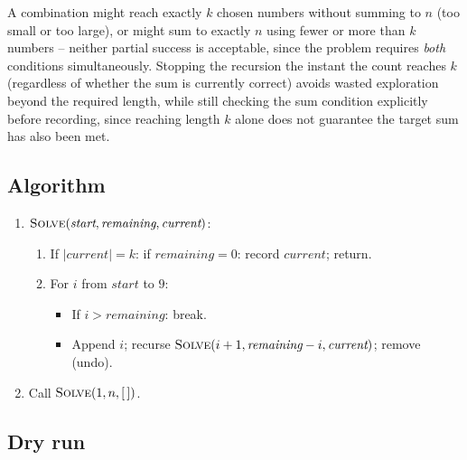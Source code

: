 A combination might reach exactly $k$ chosen numbers without summing to
$n$ (too small or too large), or might sum to exactly $n$ using fewer or
more than $k$ numbers -- neither partial success is acceptable, since the
problem requires \emph{both} conditions simultaneously. Stopping the
recursion the instant the count reaches $k$ (regardless of whether the
sum is currently correct) avoids wasted exploration beyond the required
length, while still checking the sum condition explicitly before
recording, since reaching length $k$ alone does not guarantee the target
sum has also been met.

\subsection*{Algorithm}

\begin{enumerate}
  \item $\textsc{Solve}(\textit{start}, \textit{remaining}, \textit{current})$:
  \begin{enumerate}
    \item If $|\textit{current}|=k$: if $\textit{remaining}=0$: record
          $\textit{current}$; return.
    \item For $i$ from $\textit{start}$ to $9$:
    \begin{itemize}
      \item If $i > \textit{remaining}$: break.
      \item Append $i$; recurse $\textsc{Solve}(i+1, \textit{remaining}-i,
            \textit{current})$; remove (undo).
    \end{itemize}
  \end{enumerate}
  \item Call $\textsc{Solve}(1, n, [\,])$.
\end{enumerate}

\subsection*{Dry run}


